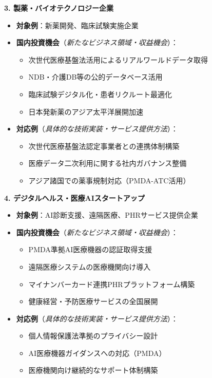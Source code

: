 \documentclass[
  a4paper,
  a4paper,
  11pt]{ltjsbook}
\providecommand{\tightlist}{%
  \setlength{\itemsep}{0pt}\setlength{\parskip}{0pt}}
\begin{document}
\textbf{3. 製薬・バイオテクノロジー企業}

\begin{itemize}
\item
  \textbf{対象例}：新薬開発、臨床試験実施企業
\item
  \textbf{国内投資機会}（\emph{新たなビジネス領域・収益機会}）：

  \begin{itemize}
  \tightlist
  \item
    次世代医療基盤法活用によるリアルワールドデータ取得
  \item
    NDB・介護DB等の公的データベース活用
  \item
    臨床試験デジタル化・患者リクルート最適化
  \item
    日本発新薬のアジア太平洋展開加速
  \end{itemize}
\item
  \textbf{対応例}（\emph{具体的な技術実装・サービス提供方法}）：

  \begin{itemize}
  \tightlist
  \item
    次世代医療基盤法認定事業者との連携体制構築
  \item
    医療データ二次利用に関する社内ガバナンス整備
  \item
    アジア諸国での薬事規制対応（PMDA-ATC活用）
  \end{itemize}
\end{itemize}

\textbf{4. デジタルヘルス・医療AIスタートアップ}

\begin{itemize}
\item
  \textbf{対象例}：AI診断支援、遠隔医療、PHRサービス提供企業
\item
  \textbf{国内投資機会}（\emph{新たなビジネス領域・収益機会}）：

  \begin{itemize}
  \tightlist
  \item
    PMDA準拠AI医療機器の認証取得支援
  \item
    遠隔医療システムの医療機関向け導入
  \item
    マイナンバーカード連携PHRプラットフォーム構築
  \item
    健康経営・予防医療サービスの全国展開
  \end{itemize}
\item
  \textbf{対応例}（\emph{具体的な技術実装・サービス提供方法}）：

  \begin{itemize}
  \tightlist
  \item
    個人情報保護法準拠のプライバシー設計
  \item
    AI医療機器ガイダンスへの対応（PMDA）
  \item
    医療機関向け継続的なサポート体制構築
  \end{itemize}
\end{itemize}
\end{document}
